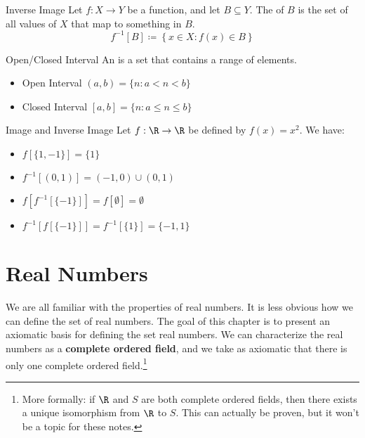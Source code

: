 \documentclass[letterpaper,12pt]{report}
\begin{document}
\begin{dfnbox}{Inverse Image}{}
	Let $f : X \to Y$ be a function, and let $B \subseteq Y$. The  of $B$ is the set of all values of $X$ that map to something in $B$.
	\tcblower
	\[ f^{-1}[B] \coloneq \left\{ x \in X : f(x) \in B \right\} \]
\end{dfnbox}



\begin{dfnbox}{Open/Closed Interval}{}
	An  is a set that contains a range of elements.
	\begin{itemize}
		\item Open Interval $(a, b) = \{ n : a<n<b \}$
		\item Closed Interval $[a, b] = \{ n : a \leq n \leq b \}$
	\end{itemize}
\end{dfnbox}

\begin{exbox}{Image and Inverse Image}{}
	Let $f : \R \to \R$ be defined by $f(x) = x^2$. We have:
	\begin{itemize}
		\item $f[\{1, -1\}] = \{1\}$
		\item $f^{-1}[(0,1)] = (-1,0) \cup (0,1)$
		\item $f[f^{-1}[\{-1\}]] = f[\emptyset] = \emptyset$
		\item $f^{-1}[f[\{-1\}]] = f^{-1}[\{1\}] = \{-1,1\}$
	\end{itemize}
\end{exbox}

\chapter{Real Numbers}
We are all familiar with the properties of real numbers. It is less obvious how we can define the set of real numbers. The goal of this chapter is to present an axiomatic basis for defining the set real numbers. We can characterize the real numbers as a \textbf{complete ordered field}, and we take as axiomatic that there is only one complete ordered field.\footnote{More formally: if $\R$ and $S$ are both complete ordered fields, then there exists a unique isomorphism from $\R$ to $S$. This can actually be proven, but it won't be a topic for these notes.}
\end{document}
